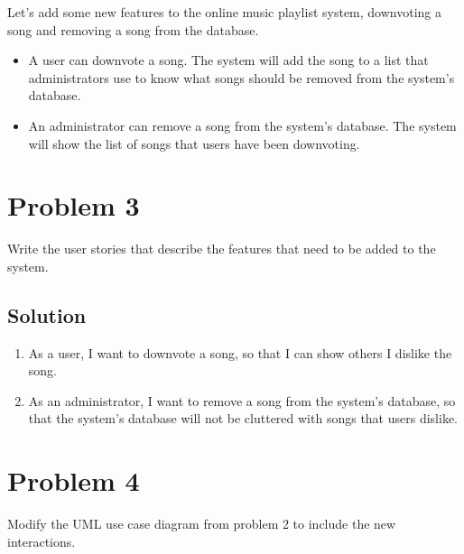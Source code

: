 \documentclass{article}
\begin{document}

    Let’s add some new features to the online music playlist system, downvoting a song and
    removing a song from the database.
    \begin{itemize}
        \item 
        A user can downvote a song. The system will add the song to a list that administrators
        use to know what songs should be removed from the system’s database.
        \item
        An administrator can remove a song from the system’s database. The system will show
        the list of songs that users have been downvoting.
    \end{itemize}


    \section*{Problem 3}

    Write the user stories that describe the features that need to be added to the
    system.

    \subsection*{Solution}

    \begin{enumerate}[label=\quad\quad, leftmargin=*]
        \item
        As a user, I want to downvote a song, so that I can show others I dislike the song.
        \item
        As an administrator, I want to remove a song from the system's database, so that 
        the system's database will not be cluttered with songs that users dislike.
    \end{enumerate}


    \section*{Problem 4}

    Modify the UML use case diagram from problem 2 to include the new interactions.
\end{document}
